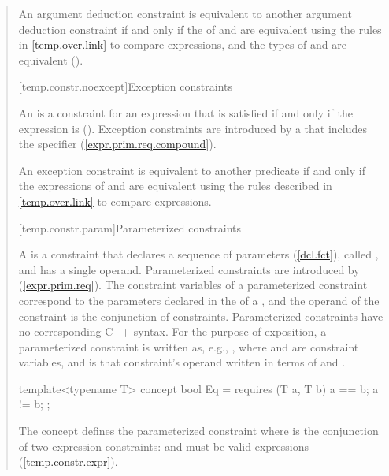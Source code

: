 \begin{quote}
\pnum
An argument deduction constraint  is equivalent to another 
argument deduction constraint  if and only if the 
 of  and  are equivalent
using the rules in \ref{temp.over.link} to compare expressions, and the types
of  and  are equivalent ().


[temp.constr.noexcept]{Exception constraints}

\pnum
An  is a constraint
for an expression  that is satisfied if and only
if the expression  is 
().
% 
\enternote
Exception constraints are introduced by a  
that includes the  specifier (\ref{expr.prim.req.compound}).
\exitnote

\pnum
An exception constraint  is equivalent to another predicate
 if and only if the expressions of  and 
are equivalent using the rules described in \ref{temp.over.link} to compare
expressions.


[temp.constr.param]{Parameterized constraints}

\pnum
A  is a constraint that declares a sequence
of parameters (\ref{dcl.fct}), called , and has a 
single operand. 
% 
\enternote
Parameterized constraints are introduced by 
 (\ref{expr.prim.req}). The constraint
variables of a parameterized constraint correspond to the 
parameters declared in the  of a
, and the operand of the constraint
is the conjunction of constraints.
\exitnote
% 
\enternote 
Parameterized constraints have no corresponding C++ syntax. For the purpose of 
exposition, a parameterized constraint is written as, e.g.,
, where  and  are
constraint variables, and  is that constraint's operand
written in terms of  and .
\exitnote
% 
\enterexample
\begin{codeblock}
template<typename T>
  concept bool Eq = requires (T a, T b) {
    a == b;
    a != b;
  };
\end{codeblock}
The concept  defines the parameterized constraint
 where  is the conjunction
of two expression constraints:  and  must be
valid expressions (\ref{temp.constr.expr}).
\exitexample


\end{quote}
